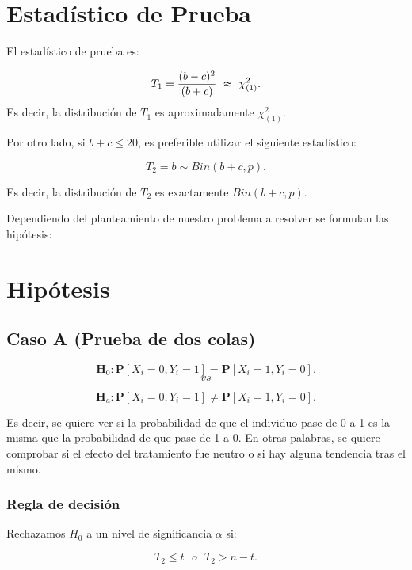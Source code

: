 \documentclass[
  a4paper,
  oneside,
  openany]{book}
\begin{document}
\hypertarget{estaduxedstico-de-prueba-3}{%
\section{Estadístico de Prueba}\label{estaduxedstico-de-prueba-3}}

El estadístico de prueba es:

\[T_{1}=\frac{(b-c)^2}{(b+c)} \ \thickapprox \ \chi^{2}_{(1)}.\]
Es decir, la distribución de \(T_{1}\) es aproximadamente \(\chi^{2}_{(1)}\).

Por otro lado, si \(b+c\leq20\), es preferible utilizar el siguiente estadístico:

\[T_{2}=b\sim Bin(b+c,p).\]

Es decir, la distribución de \(T_{2}\) es exactamente \(Bin(b+c,p).\)

Dependiendo del planteamiento de nuestro problema a resolver se formulan las hipótesis:

\hypertarget{hipuxf3tesis-3}{%
\section{Hipótesis}\label{hipuxf3tesis-3}}

\hypertarget{caso-a-prueba-de-dos-colas-3}{%
\subsection*{Caso A (Prueba de dos colas)}\label{caso-a-prueba-de-dos-colas-3}}


\[\textbf{H}_0: \mathbf{P}[X_{i}=0,Y_{i}=1]= \mathbf{P}[X_{i}=1,Y_{i}=0].\]
\[vs\]

\[\textbf{H}_a: \mathbf{P}[X_{i}=0,Y_{i}=1]\neq \mathbf{P}[X_{i}=1,Y_{i}=0].\]

Es decir, se quiere ver si la probabilidad de que el individuo pase de 0 a 1 es la misma que la probabilidad de que pase de 1 a 0. En otras palabras, se quiere comprobar si el efecto del tratamiento fue neutro o si hay alguna tendencia tras el mismo.

\hypertarget{regla-de-decisiuxf3n-9}{%
\subsubsection*{Regla de decisión}\label{regla-de-decisiuxf3n-9}}


Rechazamos \(H_0\) a un nivel de significancia \(\alpha\) si:

\[T_{2} \leq t \ \ \   o \ \ \ T_{2}>n-t.\]
\end{document}
